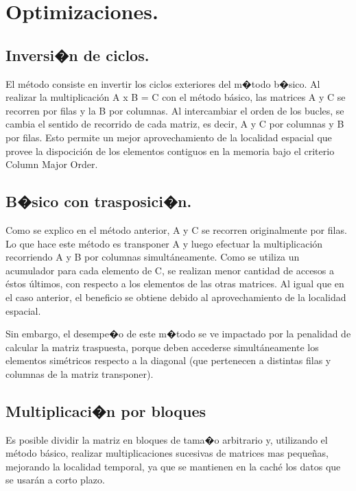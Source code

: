 \documentclass{article}
\begin{document}
\section{Optimizaciones.}

\subsection{Inversi�n de ciclos.}

El método consiste en invertir los ciclos exteriores del m�todo b�sico. Al realizar la multiplicación A x B = C con el método básico, las matrices A y C se recorren por filas y la B por columnas.
Al intercambiar el orden de los bucles, se cambia el sentido de recorrido de cada matriz, es decir, A y C por columnas y B por filas. Esto permite un mejor aprovechamiento de la localidad espacial que provee la dispocición de los elementos contiguos en la memoria bajo el criterio Column Major Order.


\subsection{B�sico con trasposici�n.}

Como se explico en el método anterior, A y C se recorren originalmente por filas. Lo que hace este método es transponer A y luego efectuar la multiplicación recorriendo A y B por columnas simultáneamente. Como se utiliza un acumulador para cada elemento de C, se realizan menor cantidad de accesos a éstos últimos, con respecto a los elementos de las otras matrices. Al igual que en el caso anterior, el beneficio se obtiene debido al aprovechamiento de la localidad espacial.

Sin embargo, el desempe�o de este m�todo se ve impactado por la penalidad de calcular la matriz traspuesta, porque deben accederse simultáneamente los elementos simétricos respecto a la diagonal (que pertenecen a distintas filas y columnas de la matriz transponer).

\subsection{Multiplicaci�n por bloques}

Es posible dividir la matriz en bloques de tama�o arbitrario y, utilizando el método básico, realizar multiplicaciones sucesivas de matrices mas pequeñas, mejorando la localidad temporal, ya que se mantienen en la caché los datos que se usarán a corto plazo.
\end{document}
